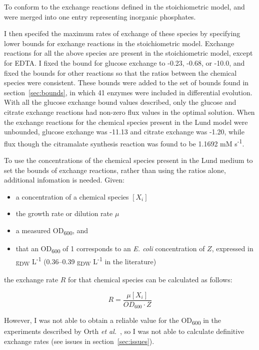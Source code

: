 \documentclass[parskip=full, numbers=noenddot]{scrreprt}
\begin{document}
To conform to the exchange reactions defined in the stoichiometric model,  and  were merged into one entry representing inorganic phosphates.

I then specifed the maximum rates of exchange of these species by specifying lower bounds for exchange reactions in the stoichiometric model. Exchange reactions for all the above species are present in the stoichiometric model, except for EDTA. I fixed the bound for glucose exchange to -0.23, -0.68, or -10.0, and fixed the bounds for other reactions so that the ratios between the chemical species were consistent. These bounds were added to the set of bounds found in section~\ref{sec:bounds}, in which 41 enzymes were included in differential evolution. With all the glucose exchange bound values described, only the glucose and citrate exchange reactions had non-zero flux values in the optimal solution. When the exchange reactions for the chemical species present in the Lund model were unbounded, glucose exchange was -11.13 and citrate exchange was -1.20, while flux though the citramalate synthesis reaction was found to be 1.1692 mM s\textsuperscript{-1}.

To use the concentrations of the chemical species present in the Lund medium to set the bounds of exchange reactions, rather than using the ratios alone, additional infomation is needed. Given:

\begin{itemize}
\item a concentration of a chemical species $[X_{i}]$
\item the growth rate or dilution rate $\mu$
\item a measured OD\textsubscript{600}, and
\item that an OD\textsubscript{600} of 1 corresponds to an \emph{E. coli} concentration of $Z$, expressed in g\textsubscript{DW} L\textsuperscript{-1} (0.36--0.39 g\textsubscript{DW} L\textsuperscript{-1} in the literature)
\end{itemize}
  
the exchange rate $R$ for that chemical species can be calculated as follows:

\[
  R = \frac{\mu[X_{i}]}{OD_{600} \cdot Z}
\]

However, I was not able to obtain a reliable value for the OD\textsubscript{600} in the experiments described by Orth \emph{et al.}~\cite{orth_comprehensive_2011}, so I was not able to calculate definitive exchange rates (see issues in section~\ref{sec:issues}).
\end{document}
